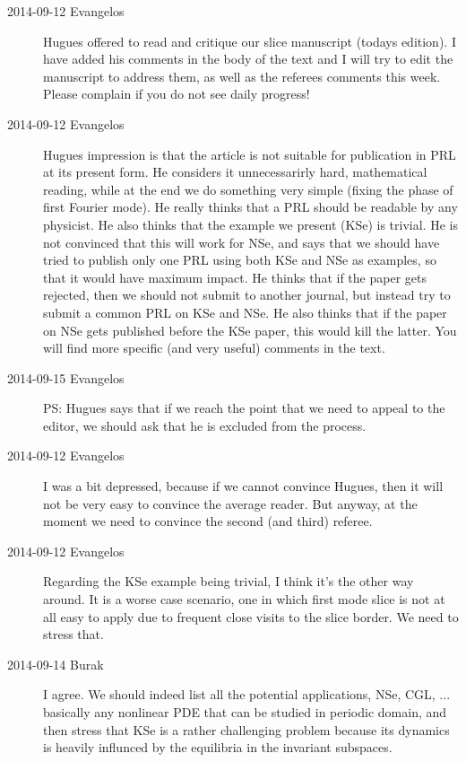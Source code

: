 \begin{description}
\item[2014-09-12 Evangelos] Hugues offered to read and critique our slice manuscript (todays edition).
I have added his comments in the body of the text and I will try to edit the manuscript
to address them, as well as the referees comments this week. Please complain if you do not
see daily progress!

\item[2014-09-12 Evangelos] Hugues impression is that the article is not suitable for publication
in PRL at its present form. He considers it unnecessarirly hard, mathematical reading, while at the
end we do something very simple (fixing the phase of first Fourier mode).
He really thinks that a PRL should be readable by any physicist.
He also thinks that the example we present (KSe) is trivial. He is not convinced that this will work for NSe, and
says that we should have tried to publish only one PRL using both KSe and NSe as examples, so that it would
have maximum impact. He thinks that if the paper gets rejected,
then we should not submit to another journal, but instead try to submit a common PRL on KSe and NSe.
He also thinks that if the paper on NSe gets published before the KSe paper, this would kill the latter.
You will find more specific (and very useful) comments in the text.

\item[2014-09-15 Evangelos] PS: Hugues says that if we reach the point that we need to appeal to the
editor, we should ask that he is excluded from the process.

\item[2014-09-12 Evangelos] I was a bit depressed, because if we cannot convince Hugues,
then it will not be very easy to convince the average reader.
But anyway, at the moment we need to convince the second (and third) referee.

\item[2014-09-12 Evangelos] Regarding the KSe example being trivial, I think it's the other way around.
It is a worse case scenario, one in which first mode slice is not at all easy to apply due to frequent
close visits to the slice border. We need to stress that.

\item[2014-09-14 Burak] I agree. We should indeed list all the potential
applications, NSe, CGL, ... basically any nonlinear PDE that can be studied in
periodic domain, and then stress that KSe is a rather challenging problem
because its dynamics is heavily influnced by the equilibria in the invariant
subspaces.


\end{description}
